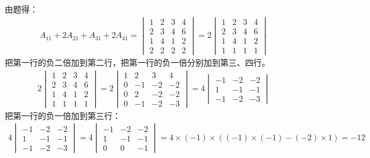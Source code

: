 \documentclass{article}
\begin{document}
\begin{jie}
由题得：
\begin{align*}
A_{11}+2A_{21}+A_{31}+2A_{41}=\begin{vmatrix}
  1 & 2 & 3 & 4 \\
  2 & 3 & 4 & 6 \\
  1 & 4 & 1 & 2 \\
  2 & 2 & 2 & 2
\end{vmatrix}=2\begin{vmatrix}
  1 & 2 & 3 & 4 \\
  2 & 3 & 4 & 6 \\
  1 & 4 & 1 & 2 \\
  1 & 1 & 1 & 1
\end{vmatrix}
\end{align*}
把第一行的负二倍加到第二行，把第一行的负一倍分别加到第三、四行。
\begin{align*}
2\begin{vmatrix}
  1 & 2 & 3 & 4 \\
  2 & 3 & 4 & 6 \\
  1 & 4 & 1 & 2 \\
  1 & 1 & 1 & 1
\end{vmatrix}=
2\begin{vmatrix}
  1 & 2 & 3 & 4 \\
  0 & -1 & -2 & -2 \\
  0 & 2 & -2 & -2 \\
  0 & -1 & -2 & -3
\end{vmatrix}=4\begin{vmatrix}
  -1 & -2 & -2 \\
   1 & -1 & -1 \\
   -1 & -2 & -3
\end{vmatrix}
\end{align*}
把第一行的负一倍加到第三行：
\begin{align*}
4\begin{vmatrix}
  -1 & -2 & -2 \\
   1 & -1 & -1 \\
   -1 & -2 & -3
\end{vmatrix}=
4\begin{vmatrix}
  -1 & -2 & -2 \\
   1 & -1 & -1 \\
  0 & 0 & -1
\end{vmatrix}=4\times(-1)\times((-1)\times(-1)-(-2)\times 1)=-12
\end{align*}
\end{jie}
\end{document}
